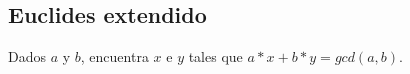{%
\subsection{Euclides extendido}
Dados $a$ y $b$, encuentra $x$ e $y$ tales que $a*x + b*y = gcd(a, b)$.
}

